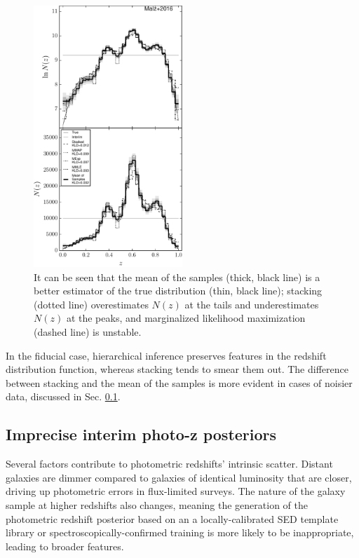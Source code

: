 \documentclass[preprint]{aastex}
\begin{document}
\begin{figure}
\includegraphics[width=0.5\textwidth]{figs/null/comps.pdf}
\caption{It can be seen that the mean of the samples (thick, black line) is a 
better estimator of the true distribution (thin, black line); stacking (dotted 
line) overestimates $N(z)$ at the tails and underestimates $N(z)$ at the peaks, 
and marginalized likelihood maximization (dashed line) is unstable.}
\label{fig:null-comp}
\end{figure}

In the fiducial case, hierarchical inference preserves features in the redshift 
distribution function, whereas stacking tends to smear them out.  The 
difference between stacking and the mean of the samples is more evident in 
cases of noisier data, discussed in Sec. \ref{sec:noisy}.

\clearpage
\subsection{Imprecise interim photo-z posteriors}
\label{sec:noisy}

Several factors contribute to photometric redshifts' intrinsic scatter.  
Distant galaxies are dimmer compared to galaxies of identical luminosity that 
are closer, driving up photometric errors in flux-limited surveys.  The nature 
of the galaxy sample at higher redshifts also changes, meaning the generation 
of the photometric redshift posterior based on an a locally-calibrated SED 
template library or spectroscopically-confirmed training is more likely to be 
inappropriate, leading to broader features.
\end{document}
